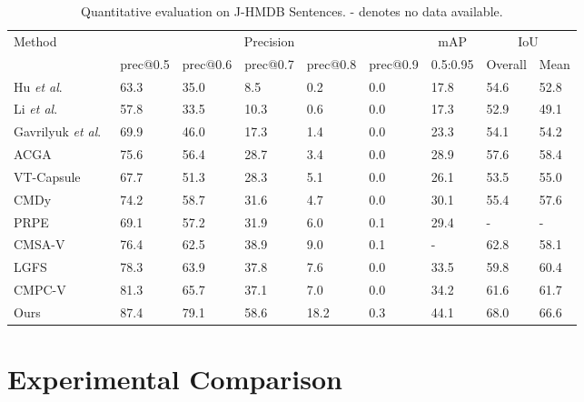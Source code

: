 \documentclass[10pt,twocolumn,letterpaper]{article}
\begin{document}
\begin{table*}[t]
\setlength{\tabcolsep}{4pt}
\small
\centering
\caption{\small{Quantitative evaluation on J-HMDB Sentences. - denotes no data available.}} \renewcommand{\arraystretch}{1.0}
\begin{tabular}{p{3.0cm}<{\centering}||p{1.2cm}<{\centering}|p{1.2cm}<{\centering}|p{1.2cm}<{\centering}|p{1.2cm}<{\centering}
|p{1.2cm}<{\centering}|p{1.2cm}<{\centering}|p{1.2cm}<{\centering}|p{1.2cm}<{\centering}}\hline
\multirow{2}{*}{Method}
&\multicolumn{5}{c|}{Precision} & \multicolumn{1}{c|}{mAP} & \multicolumn{2}{c}{IoU}\\
\cline{2-9}
&prec@0.5 &prec@0.6 &prec@0.7 &prec@0.8 &prec@0.9   &0.5:0.95   &Overall &Mean  \\
\hline \hline
Hu \emph{et al}.~\cite{hu2016segmentation}               &63.3 &35.0 &8.5  &0.2  &0.0 &17.8 &54.6 &52.8\\
Li \emph{et al}.~\cite{li2017tracking}                   &57.8 &33.5 &10.3 &0.6  &0.0 &17.3 &52.9 &49.1\\
Gavrilyuk \emph{et al}.~\cite{gavrilyuk2018actor}        &69.9 &46.0 &17.3 &1.4  &0.0 &23.3 &54.1 &54.2\\
ACGA~\cite{wang2019asymmetric}                           &75.6 &56.4 &28.7 &3.4  &0.0 &28.9 &57.6 &58.4\\
VT-Capsule~\cite{mcintosh2020visual}                     &67.7 &51.3 &28.3 &5.1  &0.0 &26.1 &53.5 &55.0\\
CMDy~\cite{wang2020context}                              &74.2 &58.7 &31.6 &4.7  &0.0 &30.1 &55.4 &57.6\\
PRPE~\cite{ningpolar}                                    &69.1 &57.2 &31.9 &6.0  &0.1 &29.4 &-    &-\\
CMSA-V~\cite{ye2021referring}                            &76.4 &62.5 &38.9 &9.0  &0.1 &-    &62.8 &58.1\\
LGFS~\cite{hui2021collaborative}                         &78.3 &63.9 &37.8 &7.6  &0.0 &33.5 &59.8 &60.4\\
CMPC-V~\cite{liu2021cross}                               &81.3 &65.7 &37.1 &7.0  &0.0 &34.2 &61.6 &61.7\\
\hline \hline
Ours                                                            &87.4 &79.1 &58.6 &18.2 &0.3 &44.1 &68.0 &66.6\\
\hline
\end{tabular}
\label{tab:video_HMDB}
\end{table*}
\section{Experimental Comparison}
\end{document}
